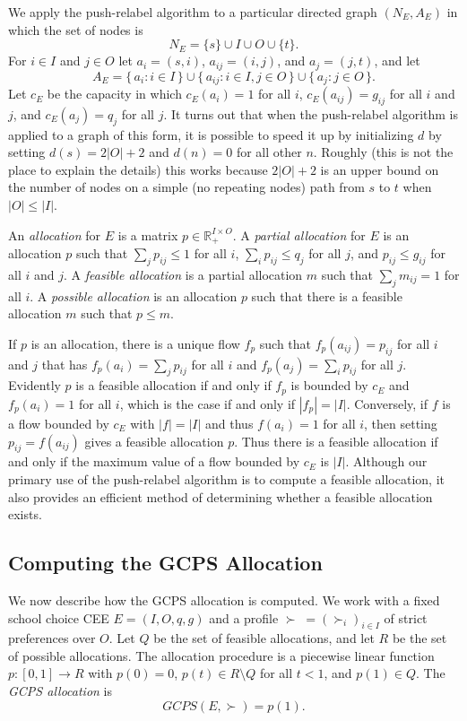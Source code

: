 \documentclass[12pt]{article}
\theoremstyle{definition}
\renewcommand{\Re}{\mathbb{R}}
\begin{document}
\begin{appendix}
We apply the push-relabel algorithm to a particular directed graph
$(N_E,A_E)$ in which the set of nodes is $$N_E = \{s\} \cup I \cup O
\cup \{t\}.$$ For $i \in I$ and $j \in O$ let $a_i = (s,i)$, $a_{ij} =
(i,j)$, and $a_j = (j,t)$, and let
$$A_E = \{\, a_i : i \in I \,\} \cup \{\, a_{ij} : i \in I, j \in O
\,\} \cup \{\, a_j : j \in O \,\}.$$ Let $c_E$ be the capacity in
which $c_E(a_i) = 1$ for all $i$, $c_E(a_{ij}) = g_{ij}$ for all $i$
and $j$, and $c_E(a_j) = q_j$ for all $j$.  It turns out that when the
push-relabel algorithm is applied to a graph of this form, it is
possible to speed it up by initializing $d$ by setting $d(s) = 2|O| +
2$ and $d(n) = 0$ for all other $n$.  Roughly (this is not the place
to explain the details) this works because $2|O| + 2$ is an upper
bound on the number of nodes on a simple (no repeating nodes) path
from $s$ to $t$ when $|O| \le |I|$.

An \emph{allocation} for $E$ is a matrix $p \in \Re_+^{I \times O}$.
A \emph{partial allocation} for $E$ is an allocation $p$ such that
$\sum_j p_{ij} \le 1$ for all $i$, $\sum_i p_{ij} \le q_j$ for all
$j$, and $p_{ij} \le g_{ij}$ for all $i$ and $j$. A \emph{feasible
allocation} is a partial allocation $m$ such that $\sum_j m_{ij} =
1$ for all $i$.  A \emph{possible allocation} is an allocation $p$
such that there is a feasible allocation $m$ such that $p \le m$.  

If $p$ is an allocation, there is a unique flow $f_p$ such that
$f_p(a_{ij}) = p_{ij}$ for all $i$ and $j$ that has $f_p(a_i) = \sum_j
p_{ij}$ for all $i$ and $f_p(a_j) = \sum_i p_{ij}$ for all
$j$. Evidently $p$ is a feasible allocation if and only if $f_p$ is
bounded by $c_E$ and $f_p(a_i) = 1$ for all $i$, which is the case if
and only if $|f_p| = |I|$.  Conversely, if $f$ is a flow bounded by
$c_E$ with $|f| = |I|$ and thus $f(a_i) = 1$ for all $i$, then setting
$p_{ij} = f(a_{ij})$ gives a feasible allocation $p$.  Thus there is a
feasible allocation if and only if the maximum value of a flow bounded
by $c_E$ is $|I|$.  Although our primary use of the push-relabel
algorithm is to compute a feasible allocation, it also provides an
efficient method of determining whether a feasible allocation exists.

\subsection{Computing the GCPS Allocation}

We now describe how the GCPS allocation is computed.  We work with
a fixed school choice CEE $E = (I,O,q,g)$ and a profile $\succ \; =
(\succ_i)_{i \in I}$ of strict preferences over $O$. Let
$Q$ be the set of feasible allocations, and let $R$ be the set of
possible allocations. The allocation procedure is a piecewise linear function $p
\colon [0,1] \to R$ with $p(0) = 0$, $p(t) \in R \setminus Q$ for all
$t < 1$, and $p(1) \in Q$.  The \emph{GCPS allocation}
is $$GCPS(E,\succ) = p(1).$$


\end{appendix}
\end{document}
